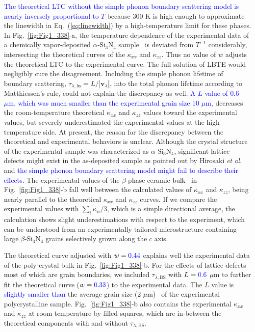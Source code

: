 \documentclass[twocolumn,amsmath,amssymb,a4paper,prb,superscriptaddress,floatfix]{revtex4-1}
\begin{document}
\textcolor {blue}{The theoretical LTC without the simple phonon boundary
scattering model is nearly inversely proportional to $T$} because 300 K is high
enough to approximate the linewidth in Eq.~(\ref{eq:linewidth}) by a
high-temperature limit for these phases.  In Fig.~\ref{fig:Fig1_338}-a, the
temperature dependence of the experimental data of a chemically vapor-deposited
$\alpha$-Si$_3$N$_4$ sample~\cite{hirai} is deviated from $T^{-1}$
considerably, intersecting the theoretical curves of the $\kappa$$_{xx}$ and
$\kappa$$_{zz}$.  Thus no value of $w$ adjusts the theoretical LTC to the
experimental curve.  The full solution of LBTE would negligibly cure the
disagreement.  Including the simple phonon lifetime of boundary scattering,
$\tau_{\lambda,\text{bs}}=L/|\mathbf{v}_\lambda|$, into the total phonon
lifetime according to Matthiessen's rule, could not explain the discrepancy as
well.  \textcolor {blue}{A $L$ value of 0.6 $\mu\text{m}$, which was much
smaller than the experimental grain size 10 $\mu\text{m}$,} decreases the
room-temperature theoretical $\kappa$$_{xx}$ and $\kappa$$_{zz}$ values toward
the experimental values, but severely underestimated the experimental values at
the high temperature side.  At present, the reason for the discrepancy between
the theoretical and experimental behaviors is unclear.  Although the crystal
structure of the experimental sample was characterized as $\alpha$-Si$_3$N$_4$,
significant lattice defects might exist in the as-deposited sample as pointed
out by Hirosaki {\it et al.}~\cite{hirosaki-md} and \textcolor{blue}{the simple
phonon boundary scattering model might fail to describe their effects.} The
experimental values of the $\beta$ phase ceramic bulk~\cite{hirosaki} in
Fig.~\ref{fig:Fig1_338}-b fall well between the calculated values of
$\kappa$$_{xx}$ and  $\kappa$$_{zz}$, being nearly parallel to the theoretical
$\kappa$$_{xx}$ and  $\kappa$$_{zz}$ curves.  If we compare the experimental
values with $\sum_i \kappa_{ii}/3$, which is a simple directional average, the
calculation shows slight underestimations with respect to the experiment, which
can be understood from an experimentally tailored microstructure containing
large $\beta$-Si$_3$N$_4$ grains selectively grown along the $c$
axis.~\cite{hirosaki}

The theoretical curve adjusted with $w=\textcolor{blue}{0.44}$ explains well the experimental
data of the poly-crystal bulk in Fig.~\ref{fig:Fig1_338}-b.  For the effects of
lattice defects most of which are grain boundaries, we included
$\tau_{\lambda,\text{BS}}$ with $L = \textcolor{blue}{0.6}$ $\mu\text{m}$ to further fit the
theoretical curve ($w=\textcolor{blue}{0.33}$) to the experimental data.  The $L$ value is
\textcolor{blue}{slightly smaller than} the average grain size (2 $\mu\text{m}$)~\cite{hirosaki} of the
experimental polycrystalline sample.  Fig.~\ref{fig:Fig1_338}-b also contains
the experimental $\kappa$$_{xx}$ and $\kappa$$_{zz}$ at room temperature by
filled squares, which are in-between the theoretical components with and
without $\tau_{\lambda,\text{BS}}$. 
\end{document}
